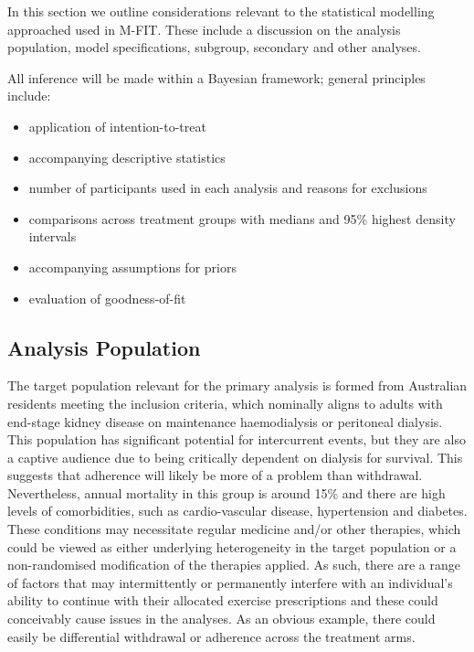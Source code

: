 \documentclass[
]{article}
\begin{document}
In this section we outline considerations relevant to the statistical modelling approached used in M-FIT.
These include a discussion on the analysis population, model specifications, subgroup, secondary and other analyses.

All inference will be made within a Bayesian framework; general principles include:

\begin{itemize}
  \item application of intention-to-treat
  \item accompanying descriptive statistics
  \item number of participants used in each analysis and reasons for exclusions
  \item comparisons across treatment groups with medians and 95\% highest density intervals
  \item accompanying assumptions for priors
  \item evaluation of goodness-of-fit
\end{itemize}

\hypertarget{analysis-population}{%
  \subsection{Analysis Population}\label{analysis-population}}

The target population relevant for the primary analysis is formed from Australian residents meeting the inclusion criteria, which nominally aligns to adults with end-stage kidney disease on  maintenance haemodialysis or peritoneal dialysis.
This population has significant potential for intercurrent events, but they are also a captive audience due to being critically dependent on dialysis for survival.
This suggests that adherence will likely be more of a problem than withdrawal.
Nevertheless, annual mortality in this group is around 15\% and there are high levels of  comorbidities, such as cardio-vascular disease, hypertension and diabetes.
These conditions may necessitate regular medicine and/or other therapies, which could be viewed as either underlying heterogeneity in the target population or a non-randomised modification of the therapies applied.
As such, there are a range of factors that may intermittently or permanently interfere with an individual's ability to continue with their allocated exercise prescriptions and these could conceivably cause issues in the analyses.
As an obvious example, there could easily be differential withdrawal or adherence across the treatment arms.
\end{document}

